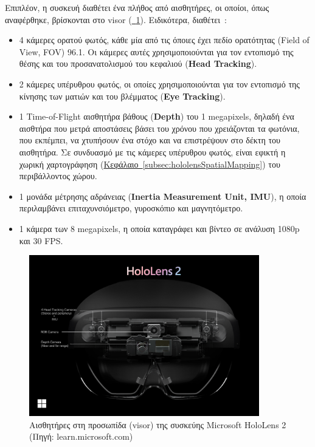 Επιπλέον, η συσκευή διαθέτει ένα πλήθος από αισθητήρες, οι οποίοι, όπως αναφέρθηκε, βρίσκονται στο visor (\hyperref[fig:hololensDeviceVisor]{\schema~\ref*{fig:hololensDeviceVisor}}). Ειδικότερα, διαθέτει~\cite{scooley_2023_hololens}:
\begin{itemize}
    \item 4 κάμερες ορατού φωτός, κάθε μία από τις όποιες έχει πεδίο ορατότητας (Field of View, FOV) 96.1\textdegree. Οι κάμερες αυτές χρησιμοποιούνται για τον εντοπισμό της θέσης και του προσανατολισμού του κεφαλιού (\textbf{Head Tracking}).
    \item 2 κάμερες υπέρυθρου φωτός, οι οποίες χρησιμοποιούνται για τον εντοπισμό της κίνησης των ματιών και του βλέμματος (\textbf{Eye Tracking}).
    \item 1 Time-of-Flight αισθητήρα βάθους (\textbf{Depth}) του 1 megapixels, δηλαδή ένα αισθτήρα που μετρά αποστάσεις βάσει του χρόνου που χρειάζονται τα φωτόνια, που εκπέμπει, να χτυπήσουν ένα στόχο και να επιστρέψουν στο δέκτη του αισθητήρα. Σε συνδυασμό με τις  κάμερες υπέρυθρου φωτός, είναι εφικτή η χωρική χαρτογράφηση (\hyperref[subsec:hololensSpatialMapping]{Κεφάλαιο~\ref*{subsec:hololensSpatialMapping}}) του περιβάλλοντος χώρου. 
    \item 1 μονάδα μέτρησης αδράνειας (\textbf{Inertia Measurement Unit, IMU}), η οποία περιλαμβάνει επιταχυνσιόμετρο, γυροσκόπιο και μαγνητόμετρο.
    \item 1 κάμερα των 8 megapixels, η οποία καταγράφει και βίντεο σε ανάλυση 1080p και 30 FPS\@.
\end{itemize}
\begin{figure}[!hb]
    \centering
    \includegraphics[width=100mm]{images/microsoft_hololens_2_parts1.png}
    \caption[Αισθητήρες στη προσωπίδα (visor) της συσκεύης Microsoft HoloLens 2]{Αισθητήρες στη προσωπίδα (visor) της συσκεύης Microsoft HoloLens 2 {\footnotesize (Πηγή: learn.microsoft.com)}}\label{fig:hololensDeviceVisor}
\end{figure}

